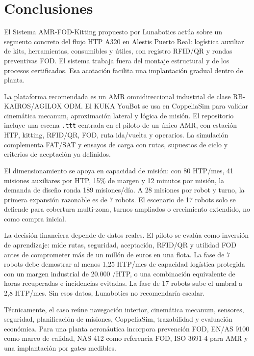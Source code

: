 \chapter{Conclusiones}

El Sistema AMR-FOD-Kitting propuesto por Lunabotics actúa sobre un segmento concreto del flujo HTP A320 en Alestis Puerto Real: logística auxiliar de kits, herramientas, consumibles y útiles, con registro RFID/QR y rondas preventivas FOD. El sistema trabaja fuera del montaje estructural y de los procesos certificados. Esa acotación facilita una implantación gradual dentro de planta.

La plataforma recomendada es un AMR omnidireccional industrial de clase RB-KAIROS/AGILOX ODM. El KUKA YouBot se usa en CoppeliaSim para validar cinemática mecanum, aproximación lateral y lógica de misión. El repositorio incluye una escena \texttt{.ttt} centrada en el piloto de un único AMR, con estación HTP, kitting, RFID/QR, FOD, ruta ida/vuelta y operarios. La simulación complementa FAT/SAT y ensayos de carga con rutas, supuestos de ciclo y criterios de aceptación ya definidos.

El dimensionamiento se apoya en capacidad de misión: con 80 HTP/mes, 41 misiones auxiliares por HTP, 15\% de margen y 12 minutos por misión, la demanda de diseño ronda 189 misiones/día. A 28 misiones por robot y turno, la primera expansión razonable es de 7 robots. El escenario de 17 robots solo se defiende para cobertura multi-zona, turnos ampliados o crecimiento extendido, no como compra inicial.

La decisión financiera depende de datos reales. El piloto se evalúa como inversión de aprendizaje: mide rutas, seguridad, aceptación, RFID/QR y utilidad FOD antes de comprometer más de un millón de euros en una flota. La fase de 7 robots debe demostrar al menos 1,25 HTP/mes de capacidad logística protegida con un margen industrial de 20.000 \texteuro{}/HTP, o una combinación equivalente de horas recuperadas e incidencias evitadas. La fase de 17 robots sube el umbral a 2,8 HTP/mes. Sin esos datos, Lunabotics no recomendaría escalar.

Técnicamente, el caso reúne navegación interior, cinemática mecanum, sensores, seguridad, planificación de misiones, CoppeliaSim, trazabilidad y evaluación económica. Para una planta aeronáutica incorpora prevención FOD, EN/AS 9100 como marco de calidad, NAS 412 como referencia FOD, ISO 3691-4 para AMR y una implantación por gates medibles.
